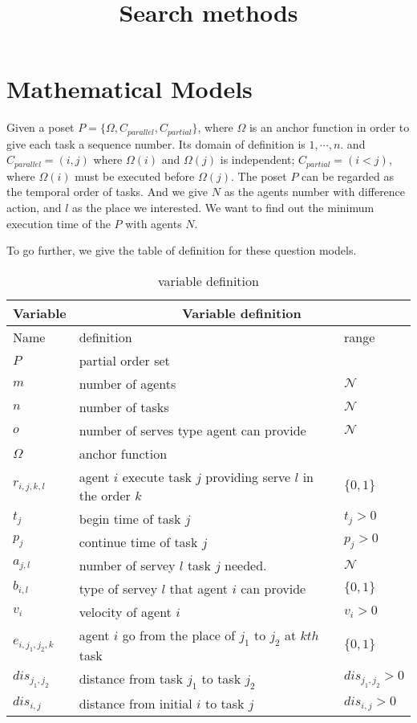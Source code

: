 \documentclass[10pt, Oct]{IEEEtran}
\title{
Search methods
}
\begin{document}
	
\maketitle
\section{Mathematical Models}
Given a poset $P=\{\Omega,C_{parallel},C_{partial}\}$, where $\Omega$ is an anchor function in order to give each task a sequence number. Its  domain of definition is ${1,\cdots,n}$. and $C_{parallel}={(i,j)}$ where $\Omega(i)$ and $\Omega(j)$ is independent; $C_{partial}={(i<j)}$, where $\Omega(i)$ must be executed before $\Omega(j)$. The poset $P$ can be regarded as the temporal order of tasks. And we give $N$ as the agents number with difference action, and $l$ as the place we interested. We want to find out the minimum execution time of the $P$ with agents $N$.

To go further, we give the table of definition for these question models.
\begin{table}[h]

	\begin{tabular}{|l|p{}|p{}|}\hline
		Variable &\multicolumn{2}{c|}{ Variable definition }\\\hline
		Name & definition & range \\
		$P$ & partial order set& \\
		$m$  & number of agents & $\mathcal{N}$\\
		$n$ & number of tasks & $\mathcal{N}$ \\
		$o$ & number of serves type agent can provide & $ \mathcal{N}$\\
		$\Omega$ & anchor function &\\
		$r_{i,j,k,l}$ & agent $i$ execute task $j$ providing serve $l$ in the order $k$ & $\{0,1\}$\\ 
		$t_j$ & begin time of task $j$ & $t_j>0$ \\
		$p_j$ & continue time of task $j$ & $p_j >0$\\
		$a_{j,l}$ & number of servey $l$ task $j$ needed. & $\mathcal{N}$\\
		$b_{i,l}$ & type of servey $l$ that agent $i$ can provide & $\{0,1\}$ \\
		$v_i$ & velocity of agent $i$ &   $v_i>0$\\
		$e_{i,j_1,j_2,k}$& agent $i$ go from the place of $j_1$ to $j_2$  at $k th$ task& $\{0,1\}$ \\
		$dis_{j_1,j_2}$ & distance from task $j_1$ to task $j_2$ &  $dis_{j_1,j_2}>0$\\
		$dis_{i,j}$ & distance from initial $i$ to task $j$ & $dis_{i,j}>0$\\\hline
	\end{tabular}
	\centering
	\caption{variable definition}

	\label{tab:Margin_settings}

\end{table}
\end{document}
